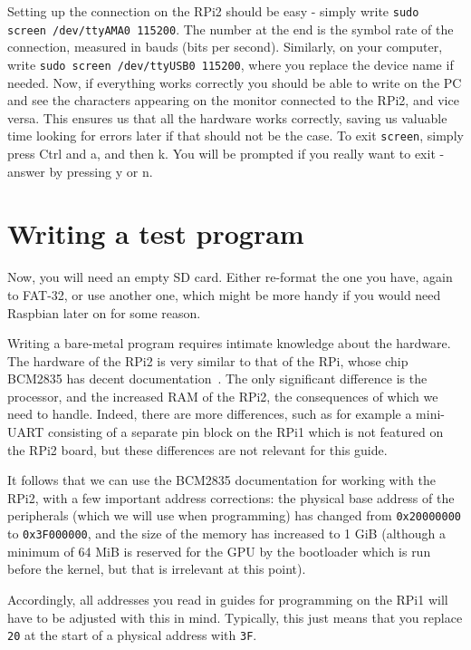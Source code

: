 \documentclass[a4paper,11pt,reqno]{amsart}
\begin{document}
Setting up the connection on the RPi2 should be easy - simply write \texttt{sudo screen /dev/ttyAMA0 115200}. The number at the end is the symbol rate of the connection, measured in bauds (bits per second). Similarly, on your computer, write \texttt{sudo screen /dev/ttyUSB0 115200}, where you replace the device name if needed. Now, if everything works correctly you should be able to write on the PC and see the characters appearing on the monitor connected to the RPi2, and vice versa. This ensures us that all the hardware works correctly, saving us valuable time looking for errors later if that should not be the case. To exit \texttt{screen}, simply press Ctrl and a, and then k. You will be prompted if you really want to exit - answer by pressing y or n.

\section{Writing a test program}
Now, you will need an empty SD card. Either re-format the one you have, again to FAT-32, or use another one, which might be more handy if you would need Raspbian later on for some reason.

Writing a bare-metal program requires intimate knowledge about the hardware. The hardware of the RPi2 is very similar to that of the RPi, whose chip BCM2835 has decent documentation~\cite{bcm2835}. The only significant difference is the processor, and the increased RAM of the RPi2, the consequences of which we need to handle. Indeed, there are more differences, such as for example a mini-UART consisting of a separate pin block on the RPi1 which is not featured on the RPi2 board, but these differences are not relevant for this guide.

It follows that we can use the BCM2835 documentation for working with the RPi2, with a few important address corrections: the physical base address of the peripherals (which we will use when programming) has changed from \texttt{0x20000000} to \texttt{0x3F000000}, and the size of the memory has increased to 1 GiB (although a minimum of 64 MiB is reserved for the GPU by the bootloader which is run before the kernel, but that is irrelevant at this point).

Accordingly, all addresses you read in guides for programming on the RPi1 will have to be adjusted with this in mind. Typically, this just means that you replace \texttt{20} at the start of a physical address with \texttt{3F}.
\end{document}
